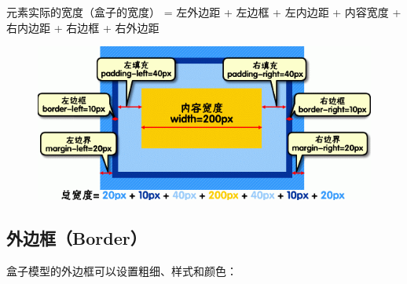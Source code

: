元素实际的宽度（盒子的宽度） = 左外边距 + 左边框 + 左内边距 + 内容宽度 + 右内边距 + 右边框 + 右外边距 \\

\begin{figure}[H]
    \centering
    \includegraphics[]{img/C8/8-2/2.png}
\end{figure}

\subsection{外边框（Border）}

盒子模型的外边框可以设置粗细、样式和颜色：

